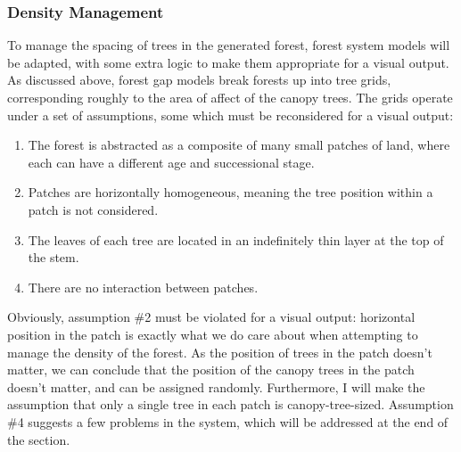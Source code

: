 \documentclass{article}
\newcommand{\tab}{\hspace*{2em}}
\begin{document}
            \subsubsection{Density Management}
    \tab To manage the spacing of trees in the generated forest, forest system models will be
adapted, with some extra logic to make them appropriate for a visual output. As discussed above,
forest gap models break forests up into tree grids, corresponding roughly to the area of affect of
the canopy trees\cite{moorcroft01}. The grids operate under a set of assumptions\cite{bugmann01},
some which must be reconsidered for a visual output:
\begin{enumerate}
    \item The forest is abstracted as a composite of many small patches of land, where each can
have a different age and successional stage.
    \item Patches are horizontally homogeneous, meaning the tree position within a patch is not
considered.
    \item The leaves of each tree are located in an indefinitely thin layer at the top of the stem.
    \item There are no interaction between patches.
\end{enumerate}
    \tab Obviously, assumption \#2 must be violated for a visual output: horizontal position in the
patch is exactly what we do care about when attempting to manage the density of the forest. As the
position of trees in the patch doesn't matter, we can conclude that the position of the canopy
trees in the patch doesn't matter, and can be assigned randomly. Furthermore, I will make the
assumption that only a single tree in each patch is canopy-tree-sized. Assumption \#4 suggests a
few problems in the system, which will be addressed at the end of the section.
\end{document}

